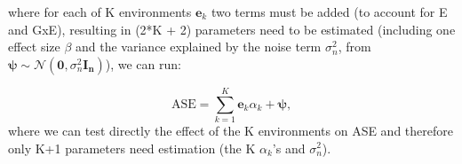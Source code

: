 \begin{Comment}
where for each of K environments $\mathbf{e}_k$ two terms must be added (to account for E and GxE), resulting in (2*K + 2) parameters need to be estimated (including one effect size $\beta$ and the variance explained by the noise term $\sigma_n^2$, from $\boldsymbol{\psi} \sim \mathcal{N}(\mathbf{0}, \sigma_n^2\mathbf{I_n})$), we can run:

\begin{equation*}
    \mathrm{ASE} = \sum_{k=1}^{K} \mathbf{e}_k\alpha_k + \boldsymbol{\psi}, 
\end{equation*}
where we can test directly the effect of the K environments on ASE and therefore only K+1 parameters need estimation (the K $\alpha_k$'s and $\sigma_n^2$).

\end{Comment}




